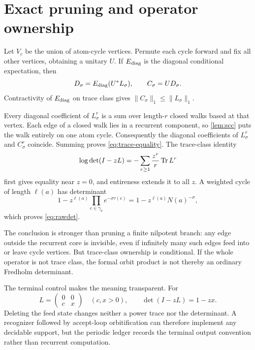 \section{Exact pruning and operator ownership}
\label{sec:pruning}

Let $V_c$ be the union of atom-cycle vertices.  Permute each cycle forward
and fix all other vertices, obtaining a unitary $U$.  If $E_{\rm diag}$ is
the diagonal conditional expectation, then
\[
D_\sigma=E_{\rm diag}(U^*L_\sigma),\qquad C_\sigma=UD_\sigma.
\]
Contractivity of $E_{\rm diag}$ on trace class gives
$\|C_\sigma\|_1\le\|L_\sigma\|_1$.

Every diagonal coefficient of $L_\sigma^r$ is a sum over length-$r$ closed
walks based at that vertex.  Each edge of a closed walk lies in a recurrent
component, so \cref{lem:scc} puts the walk entirely on one atom cycle.
Consequently the diagonal coefficients of $L_\sigma^r$ and $C_\sigma^r$
coincide.  Summing proves \eqref{eq:trace-equality}.  The trace-class
identity
\[
\log\det(I-zL)=-\sum_{r\ge1}\frac{z^r}{r}\operatorname{Tr} L^r
\]
first gives equality near $z=0$, and entireness extends it to all $z$.  A
weighted cycle of length $\ell(a)$ has determinant
\[
1-z^{\ell(a)}\prod_{e\in\gamma_a}e^{-\sigma\tau(e)}
=1-z^{\ell(a)}N(a)^{-\sigma},
\]
which proves \eqref{eq:rawdet}.

The conclusion is stronger than pruning a finite nilpotent branch: any edge
outside the recurrent core is invisible, even if infinitely many such edges
feed into or leave cycle vertices.  But trace-class ownership is conditional.
If the whole operator is not trace class, the formal orbit product is not
thereby an ordinary Fredholm determinant.

The terminal control makes the meaning transparent.  For
\[
L=\begin{pmatrix}0&0\\ c&x\end{pmatrix}
\quad(c,x>0),
\qquad \det(I-zL)=1-zx.
\]
Deleting the feed state changes neither a power trace nor the determinant.
A recognizer followed by accept-loop orbitification can therefore implement
any decidable support, but the periodic ledger records the terminal output
convention rather than recurrent computation.
